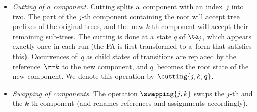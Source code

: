\begin{itemize}
\item \emph{Cutting of a component.}
Cutting splits a~component with an index~$j$ into two. 
The part of the $j$-th component containing the root will accept tree prefixes
of the original trees, and the~new $k$-th component will accept their remaining
sub-trees.
The cutting is done at a state $q$ of $\ta_j$, which appears exactly once in
each run (the FA is first transformed to a~form that satisfies this). 
Occurrences of~$q$ as child states of transitions are replaced by the
reference~$\rr k$ to the new component, and $q$~becomes the root state of the new
component. 
We denote this operation by $\cutting{j,k,q}$.
\item \emph{Swapping of components.}
  The operation $\swapping{j,k}$ swaps the
  $j$-th and the $k$-th component (and renames references and assignments
  accordingly). 
\end{itemize}

